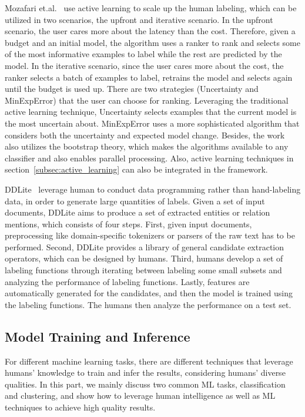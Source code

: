 Mozafari et.al.~\cite{DBLP:journals/pvldb/MozafariSFJM14} use active learning to scale up the human labeling, which can be utilized in two scenarios, the upfront and iterative scenario. In the upfront scenario, the user cares more about the latency than the cost. Therefore, given a budget and an initial model, the algorithm uses a ranker to rank and selects some of the most informative examples to label while the rest are predicted by the model. In the iterative scenario, since the user cares more about the cost, the ranker selects a batch of examples to label, retrains the model and selects again until the budget is used up. There are two strategies (Uncertainty and MinExpError) that the user can choose for ranking.  Leveraging the traditional active learning technique, Uncertainty selects examples that the current model is the most uncertain about.  MinExpError uses a more sophisticated algorithm that considers both  the uncertainty and expected model change. Besides, the work also utilizes the bootstrap theory, which makes the algorithms available to any classifier and also enables parallel processing. Also, active learning techniques in section~\ref{subsec:active_learning} can also be integrated in the framework.

DDLite~\cite{DBLP:conf/sigmod/Ehrenberg0RFR16} leverage human to conduct data programming rather than hand-labeling data, in order to generate large quantities of labels. Given a set of input documents, DDLite aims to produce a set of extracted entities or relation mentions, which consists of four steps. First,  given input documents,  preprocessing like domain-specific tokenizers or parsers  of the raw text has to be performed. Second, DDLite provides a library of general candidate extraction operators, which can be designed by humans. Third, humans develop a set of labeling functions through iterating between labeling some small subsets and analyzing the  performance of  labeling functions.
Lastly,  features are automatically generated for the candidates, and then the model is trained using the labeling functions. The humans then analyze the performance on a test set.

\subsection{Model Training and Inference}

 For different machine learning tasks, there are different techniques that leverage humans' knowledge to train and infer the results,  considering humans' diverse qualities. In this part, we mainly discuss two common ML tasks, classification and clustering, and  show how to leverage human intelligence as well as ML techniques to achieve high quality results.


